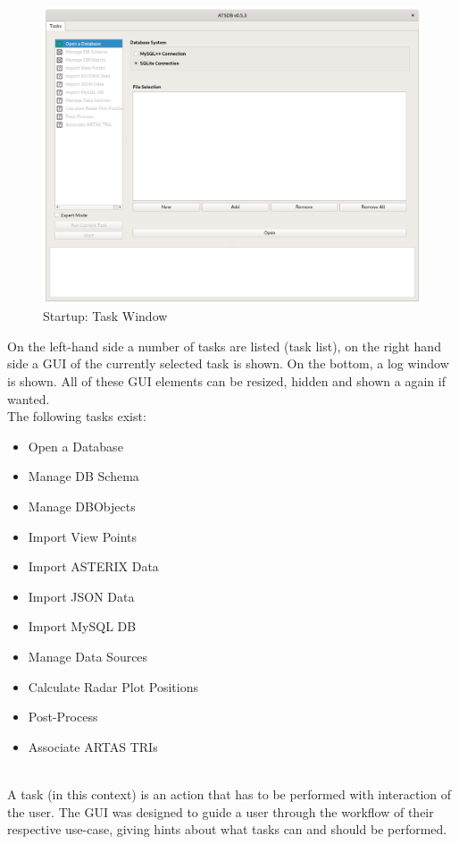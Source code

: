 \begin{figure}[H]
  \hspace*{-2.5cm}
    \includegraphics[width=19cm]{../screenshots/task_open_database.png}
  \caption{Startup: Task Window}
\end{figure}

On the left-hand side a number of tasks are listed (task list), on the right hand side a GUI of the currently selected task is shown. On the bottom, a log window is shown. All of these GUI elements can be resized, hidden and shown a again if wanted. \\


The following tasks exist:
\begin{itemize}
 \item Open a Database
 \item Manage DB Schema
 \item Manage DBObjects
 \item Import View Points
 \item Import ASTERIX Data
 \item Import JSON Data
 \item Import MySQL DB
 \item Manage Data Sources
 \item Calculate Radar Plot Positions
 \item Post-Process
 \item Associate ARTAS TRIs
\end{itemize}
\  \\

A task (in this context) is an action that has to be performed with interaction of the user. The GUI was designed to guide a user through the workflow of their respective use-case, giving hints about what tasks can and should be performed. \\

